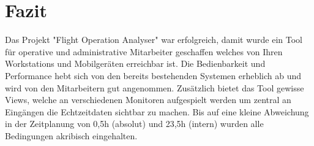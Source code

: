 \section{Fazit}
    Das Projekt "Flight Operation Analyser" war erfolgreich, damit wurde ein Tool für operative und administrative Mitarbeiter geschaffen welches von Ihren Workstations und Mobilgeräten erreichbar ist. Die Bedienbarkeit und Performance hebt sich von den bereits bestehenden Systemen erheblich ab und wird von den Mitarbeitern gut angenommen. Zusätzlich bietet das Tool gewisse Views, welche an verschiedenen Monitoren aufgespielt werden um zentral an Eingängen die Echtzeitdaten sichtbar zu machen. Bis auf eine kleine Abweichung in der Zeitplanung von 0,5h (absolut) und 23,5h (intern) wurden alle Bedingungen akribisch eingehalten. 